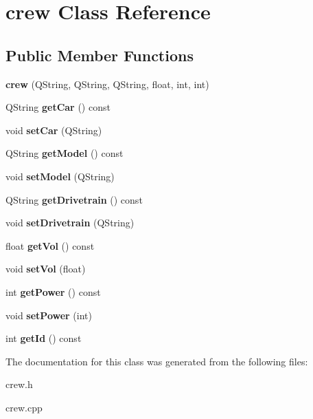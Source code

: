 \hypertarget{classcrew}{}\section{crew Class Reference}
\label{classcrew}
\subsection*{Public Member Functions}
\begin{DoxyCompactItemize}
\item 
\hypertarget{classcrew_a6e456cfd0ae54351c9b905697a16e7a8}{}\label{classcrew_a6e456cfd0ae54351c9b905697a16e7a8} 
{\bfseries crew} (Q\+String, Q\+String, Q\+String, float, int, int)
\item 
\hypertarget{classcrew_a4dc7e14c8f45f77de3fa71ab37a04704}{}\label{classcrew_a4dc7e14c8f45f77de3fa71ab37a04704} 
Q\+String {\bfseries get\+Car} () const
\item 
\hypertarget{classcrew_a9e026f669a61e2c4da28e5bdd5e11ce8}{}\label{classcrew_a9e026f669a61e2c4da28e5bdd5e11ce8} 
void {\bfseries set\+Car} (Q\+String)
\item 
\hypertarget{classcrew_af0075b1ca3dc6d7307030bc30cae025b}{}\label{classcrew_af0075b1ca3dc6d7307030bc30cae025b} 
Q\+String {\bfseries get\+Model} () const
\item 
\hypertarget{classcrew_a78b8e25ca2c3019c994c1f1e44fa1519}{}\label{classcrew_a78b8e25ca2c3019c994c1f1e44fa1519} 
void {\bfseries set\+Model} (Q\+String)
\item 
\hypertarget{classcrew_a7e095f7e2750a9caf3b92df2d6f8c420}{}\label{classcrew_a7e095f7e2750a9caf3b92df2d6f8c420} 
Q\+String {\bfseries get\+Drivetrain} () const
\item 
\hypertarget{classcrew_aaee38cf8aaf5091eb26c8d89b2fe1a4c}{}\label{classcrew_aaee38cf8aaf5091eb26c8d89b2fe1a4c} 
void {\bfseries set\+Drivetrain} (Q\+String)
\item 
\hypertarget{classcrew_a8633ef062b9eaec13a3ed11f8b02cd0f}{}\label{classcrew_a8633ef062b9eaec13a3ed11f8b02cd0f} 
float {\bfseries get\+Vol} () const
\item 
\hypertarget{classcrew_ac5403c12bfc2e3b9cb63c93681ecff49}{}\label{classcrew_ac5403c12bfc2e3b9cb63c93681ecff49} 
void {\bfseries set\+Vol} (float)
\item 
\hypertarget{classcrew_acc286896ae75c9f12942e87e228432d6}{}\label{classcrew_acc286896ae75c9f12942e87e228432d6} 
int {\bfseries get\+Power} () const
\item 
\hypertarget{classcrew_a4d85c4284a0cddbb742346e72e097640}{}\label{classcrew_a4d85c4284a0cddbb742346e72e097640} 
void {\bfseries set\+Power} (int)
\item 
\hypertarget{classcrew_a80f7b8bc3835dc92734217cf92157b82}{}\label{classcrew_a80f7b8bc3835dc92734217cf92157b82} 
int {\bfseries get\+Id} () const
\end{DoxyCompactItemize}


The documentation for this class was generated from the following files\+:\begin{DoxyCompactItemize}
\item 
crew.\+h\item 
crew.\+cpp\end{DoxyCompactItemize}
